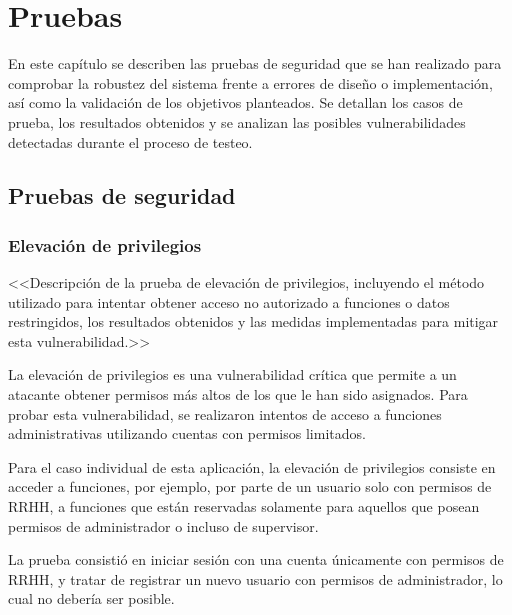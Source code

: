 \chapter{Pruebas} \label{chp:pruebas}


En este capítulo se describen las pruebas de seguridad que se han realizado para comprobar la robustez del sistema frente a errores de diseño o implementación, así como la validación de los objetivos planteados. Se detallan los casos de prueba, los resultados obtenidos y se analizan las posibles vulnerabilidades detectadas durante el proceso de testeo.


\section{Pruebas de seguridad} \label{sct:pruebas:seguridad}

\subsection{Elevación de privilegios}
<<Descripción de la prueba de elevación de privilegios, incluyendo el método utilizado para intentar obtener acceso no autorizado a funciones o datos restringidos, los resultados obtenidos y las medidas implementadas para mitigar esta vulnerabilidad.>>

La elevación de privilegios es una vulnerabilidad crítica que permite a un atacante obtener permisos más altos de los que le han sido asignados. Para probar esta vulnerabilidad, se realizaron intentos de acceso a funciones administrativas utilizando cuentas con permisos limitados.

Para el caso individual de esta aplicación, la elevación de privilegios consiste en acceder a funciones, por ejemplo, por parte de un usuario solo con permisos de RRHH, a funciones que están reservadas solamente para aquellos que posean permisos de administrador o incluso de supervisor.

La prueba consistió en iniciar sesión con una cuenta únicamente con permisos de RRHH, y tratar de registrar un nuevo usuario con permisos de administrador, lo cual no debería ser posible.

